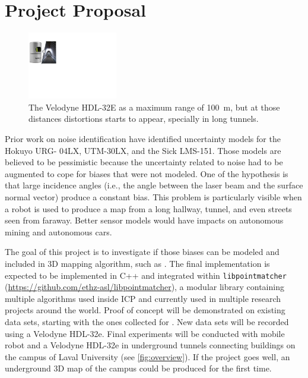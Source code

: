 \documentclass[10pt,letterpaper,oneside]{article}
\author{Fran\c{c}ois Pomerleau \\
       Laval University\\
       1065, av. de la Médecine \\
       Quebec, Qc \\
       Canada G1V 0A6 \\
       \texttt{<francois.pomerleau@ift.ulaval.ca>}
}
\begin{document}
\makeCustomTitle

\section*{Project Proposal}

\begin{figure}
\centering
\includegraphics[width=0.35\textwidth]{./figs/overview.pdf}
\caption{
The Velodyne HDL-32E as a maximum range of \SI{100}{\m}, but at those distances distortions starts to appear, specially in long tunnels.
}
\label{fig:overview}
\end{figure}

Prior work on noise identification \cite{Pomerleau2012} have identified uncertainty models for the Hokuyo URG- 04LX, UTM-30LX, and the Sick LMS-151.
Those models are believed to be pessimistic because the uncertainty related to noise had to be augmented to cope for biases that were not modeled.
One of the hypothesis is that large incidence angles (i.e., the angle between the laser beam and the surface normal vector) produce a constant bias.
This problem is particularly visible when a robot is used to produce a map from a long hallway, tunnel, and even streets seen from faraway.
Better sensor models would have impacts on autonomous mining and autonomous cars.

The goal of this project is to investigate if those biases can be modeled and included in 3D mapping algorithm, such as \cite{Pomerleau2014}.
The final implementation is expected to be implemented in C++ and integrated within \texttt{libpointmatcher} (\url{https://github.com/ethz-asl/libpointmatcher}), a modular library containing multiple algorithms used inside \ac{ICP} and currently used in multiple research projects around the world.
Proof of concept will be demonstrated on existing data sets, starting with the ones collected for \cite{Pomerleau2012}.
New data sets will be recorded using a Velodyne HDL-32e.
Final experiments will be conducted with mobile robot and a Velodyne HDL-32e in underground tunnels connecting buildings on the campus of Laval University (see \autoref{fig:overview}).
If the project goes well, an underground 3D map of the campus could be produced for the first time.
\end{document}
